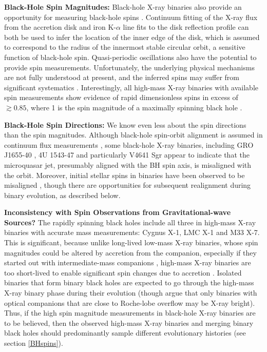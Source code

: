 \documentclass[review]{elsarticle}
\begin{document}
\textbf{Black-Hole Spin Magnitudes:} Black-hole X-ray binaries also provide an opportunity for measuring black-hole spins \citep[see][for recent reviews]{MillerMiller:2015,Reynolds:2020}.  Continuum fitting of the X-ray flux from the accretion disk and iron K-$\alpha$ line fits to the disk reflection profile can both be used to infer the location of the inner edge of the disk, which is assumed to correspond to the radius of the innermost stable circular orbit, a sensitive function of black-hole spin.  Quasi-periodic oscillations also have the potential to provide spin measurements.  Unfortunately, the underlying physical mechanisms are not fully understood at present, and the inferred spins may suffer from significant systematics \citep[e.g.,][]{Basak:2017,Kawano:2017}.  Interestingly, all high-mass X-ray binaries with available spin measurements show evidence of rapid dimensionless spins in excess of $\gtrsim 0.85$, where 1 is the spin magnitude of a maximally spinning black hole \citep{Reynolds:2020}.

\textbf{Black-Hole Spin Directions:} We know even less about the spin directions than the spin magnitudes.  Although black-hole spin-orbit alignment is assumed in continuum flux measurements \citep{MillerMiller:2015}, some black-hole X-ray binaries, including GRO J1655-40 \citep{Martin:2008}, 4U 1543-47 \citep{MorningstarMiller:2014} and particularly V4641 Sgr \citep{Orosz:2001,Martin:2008b} appear to indicate that the microquasar jet, presumably aligned with the BH spin axis, is misaligned with the orbit.  Moreover, initial stellar spins in binaries have been observed to be misaligned \citep[e.g.,][]{Albrecht:2009,Albrecht:2014}, though there are opportunities for subsequent realignment during binary evolution, as described below.

\textbf{Inconsistency with Spin Observations from Gravitational-wave Sources?} The rapidly spinning black holes include all three in high-mass X-ray binaries with accurate mass measurements: Cygnus X-1, LMC X-1 and M33 X-7.  This is significant, because unlike long-lived low-mass X-ray binaries, whose spin magnitudes could be altered by accretion from the companion, especially if they started out with intermediate-mass companions \citep{Podsiadlowski:2003,Fragos:2015}, high-mass X-ray binaries are too short-lived to enable significant spin changes due to accretion \citep{KingKolb:1999}.  Isolated binaries that form binary black holes are expected to go through the high-mass X-ray binary phase during their evolution (though \citet{HiraiMandel:2021} argue that only binaries with optical companions that are close to Roche-lobe overflow may be X-ray bright).  Thus, if the high spin magnitude measurements in black-hole X-ray binaries are to be believed, then the observed high-mass X-ray binaries and merging binary black holes should predominantly sample different evolutionary histories (see section \ref{BHspins}).
\end{document}
